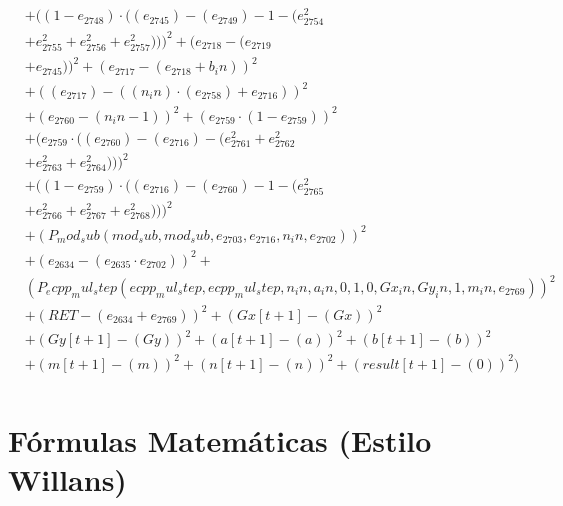 \documentclass[10pt, a4paper]{article}
\begin{document}
\begin{small}
\begin{align*}
& + ((1 - e_{2748})  \cdot  ((e_{2745}) - (e_{2749}) - 1 - (e_{2754}^{2} \\
& + e_{2755}^{2} + e_{2756}^{2} + e_{2757}^{2})))^{2} + (e_{2718} - (e_{2719} \\
& + e_{2745}))^{2} + (e_{2717} - (e_{2718} + b_in))^{2} \\
& + ((e_{2717}) - ((n_in)  \cdot  (e_{2758}) + e_{2716}))^{2} \\
& + (e_{2760} - (n_in - 1))^{2} + (e_{2759}  \cdot  (1 - e_{2759}))^{2} \\
& + (e_{2759}  \cdot  ((e_{2760}) - (e_{2716}) - (e_{2761}^{2} + e_{2762}^{2} \\
& + e_{2763}^{2} + e_{2764}^{2})))^{2} \\
& + ((1 - e_{2759})  \cdot  ((e_{2716}) - (e_{2760}) - 1 - (e_{2765}^{2} \\
& + e_{2766}^{2} + e_{2767}^{2} + e_{2768}^{2})))^{2} \\
& + (P_mod_sub(mod_sub, mod_sub, e_{2703}, e_{2716}, n_in, e_{2702}))^{2} \\
& + (e_{2634} - (e_{2635}  \cdot  e_{2702}))^{2} + \\
& (P_ecpp_mul_step(ecpp_mul_step, ecpp_mul_step, n_in, a_in, 0, 1, 0, Gx_in, Gy_in, 1, m_in, e_{2769}))^{2} \\
& + (RET - (e_{2634} + e_{2769}))^{2} + (Gx[t+1] - (Gx))^{2} \\
& + (Gy[t+1] - (Gy))^{2} + (a[t+1] - (a))^{2} + (b[t+1] - (b))^{2} \\
& + (m[t+1] - (m))^{2} + (n[t+1] - (n))^{2} + (result[t+1] - (0))^{2}) \\
\end{align*}
\end{small}\part{Fórmulas Matemáticas (Estilo Willans)}
\end{document}
